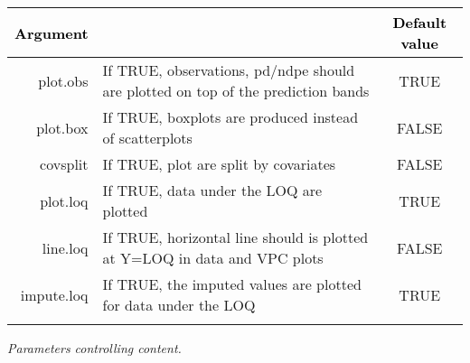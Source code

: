 \clearpage

\begin{table}[!h] 
\begin{center}
\begin{tabular}{| r p{8cm} c|}
\hline
\textbf{\textcolor{black}{Argument}} & \centering{\textbf{\textcolor{black}{Description }}} & \textbf{\textcolor{black}{Default value}} \\
\hline
 {\ttfamily plot.obs } & If TRUE, observations, pd/ndpe should are plotted on top of the prediction bands & TRUE \\
 {\ttfamily plot.box } & If TRUE, boxplots are produced instead of scatterplots & FALSE \\
 {\ttfamily covsplit } & If TRUE, plot are split by covariates & FALSE \\
 {\ttfamily plot.loq } & If TRUE, data under the LOQ are plotted & TRUE \\
 {\ttfamily line.loq } & If TRUE, horizontal line should is plotted at Y=LOQ in data and VPC plots & FALSE \\
 {\ttfamily impute.loq } & If TRUE, the imputed values are plotted for data under the LOQ & TRUE \\
{\ttfamily } & &  \\
\hline
\end{tabular} 
\end{center}
 {\itshape Parameters controlling content.} %
\end{table} 

